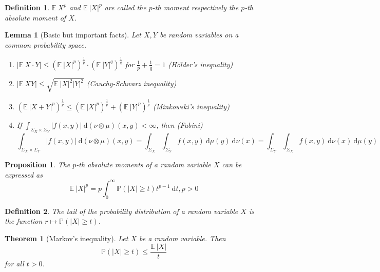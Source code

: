 \documentclass[10pt,a4paper]{article}
\theoremstyle{thmstyle}
\newtheorem{definition}{Definition}
\newtheorem{lemma}{Lemma}
\newtheorem{theorem}{Theorem}
\newtheorem{proposition}{Proposition}
\newcommand{\diff}{~\mathrm{d}}
\newcommand{\E}{\mathbb{E}~}
\renewcommand{\Pr}[1]{\mathbb{P}\left( #1 \right)}
\begin{document}
\begin{definition}
  $\E X^{p}$ and $\E |X|^{p}$ are called the \emph{$p$-th moment} respectively the \emph{$p$-th absolute moment} of $X$.
\end{definition}

\begin{lemma}[Basic but important facts]
  Let $X, Y$ be random variables on a common probability space.
  \begin{enumerate}
  \item $|\E X \cdot Y| \le \left( \E |X|^{p} \right)^{\frac{1}{p}} \cdot \left( \E |Y|^{q} \right)^{\frac{1}{q}}$ for $\frac{1}{p} + \frac{1}{q} = 1$ (Hölder's inequality)
  \item $|\E XY| \le \sqrt{\E |X|^{2} |Y|^{2}}$ (Cauchy-Schwarz inequality)
  \item $\left( \E |X + Y|^{p} \right)^{\frac{1}{p}} \le \left( \E |X|^{p} \right)^{\frac{1}{p}} + \left( \E |Y|^{p} \right)^{\frac{1}{p}}$ (Minkowski's inequality)
  \item If $\int_{\Sigma_{X} \times \Sigma_{Y}} |f(x, y)| \diff (\nu \otimes \mu)(x, y) < \infty$, then (Fubini)
    \begin{equation*}
      \int_{\Sigma_{X} \times \Sigma_{Y}} |f(x, y)| \diff (\nu \otimes \mu)(x, y) = \int_{\Sigma_{X}} \int_{\Sigma_{Y}} f(x, y) \diff \mu(y) \diff \nu(x) = \int_{\Sigma_{Y}} \int_{\Sigma_{X}} f(x, y) \diff \nu(x) \diff \mu(y)
    \end{equation*}
  \end{enumerate}
\end{lemma}

\begin{proposition}
  The $p$-th absolute moments of a random variable $X$ can be expressed as
  \begin{equation*}
    \E |X|^{p} = p \int_{0}^{\infty} \Pr{|X| \ge t} t^{p - 1} \diff t, p > 0
  \end{equation*}
\end{proposition}

\begin{definition}
  The \emph{tail} of the probability distribution of a random variable $X$ is the function $r \mapsto \Pr{|X| \ge t}$.
\end{definition}

\begin{theorem}[Markov's inequality]
  Let $X$ be a random variable. Then
  \begin{equation*}
    \Pr{|X| \ge t} \le \frac{\E |X|}{t}
  \end{equation*}
  for all $t > 0$.
\end{theorem}
\end{document}
